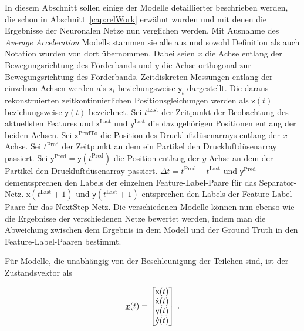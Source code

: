In diesem Abschnitt sollen einige der Modelle detaillierter beschrieben werden, die schon in Abschnitt~\ref{cap:relWork} erwähnt wurden und mit denen die Ergebnisse der Neuronalen Netze nun verglichen werden.
Mit Ausnahme des \textit{Average Acceleration} Modells stammen sie alle aus \cite{Pfaff2018} und sowohl Definition als auch Notation wurden von dort übernommen.
Dabei seien \(x\) die Achse entlang der Bewegungsrichtung des Förderbands und \(y\) die Achse orthogonal zur Bewegungsrichtung des Förderbands.
Zeitdiskreten Messungen entlang der einzelnen Achsen werden als \(\mathsf{x}_t\) beziehungsweise \(\mathsf{y}_t\) dargestellt.
Die daraus rekonstruierten zeitkontinuierlichen Positionsgleichungen werden als \(\mathsf{x}(t)\) beziehungsweise \(\mathsf{y}(t)\) bezeichnet.
Sei \(t^{\text{Last}}\) der Zeitpunkt der Beobachtung des aktuellsten Features und \(\mathsf{x}^{\text{Last}}\) und \(\mathsf{y}^{\text{Last}}\) die dazugehörigen Positionen entlang der beiden Achsen.
Sei \(\mathsf{x}^{\text{PredTo}}\) die Position des Druckluftdüsenarrays entlang der \(x\)-Achse.
Sei \(t^{\text{Pred}}\) der Zeitpunkt an dem ein Partikel den Druckluftdüsenarray passiert.
Sei \(\mathsf{y}^{\text{Pred}} = \mathsf{y}(t^{\text{Pred}})\) die Position entlang der \(y\)-Achse an dem der Partikel den Druckluftdüsenarray passiert.
\(\Delta t = t^{\text{Pred}} - t^{\text{Last}} \) und \(\mathsf{y}^{\text{Pred}}\) dementsprechen den Labels der einzelnen Feature-Label-Paare für das Separator-Netz.
\(\mathsf{x}(t^{\text{Last}} + 1)\) und \(\mathsf{y}(t^{\text{Last}} + 1)\) entsprechen den Labels der Feature-Label-Paare für das NextStep-Netz.
Die verschiedenen Modelle können nun ebenso wie die Ergebnisse der verschiedenen Netze bewertet werden, 
indem man die Abweichung zwischen dem Ergebnis in dem Modell und der Ground Truth in den Feature-Label-Paaren bestimmt.


Für Modelle, die unabhängig von der Beschleunigung der Teilchen sind, ist der Zustandsvektor als 

\begin{equation} \label{eq:definitionCV}
    {\underline{x}}(t) = 
    \begin{bmatrix}
        \mathsf{x}(t) \\
        \dot{\mathsf{x}}(t) \\
        \mathsf{y}(t) \\
        \dot{\mathsf{y}}(t)
       \end{bmatrix} \: .
\end{equation}

